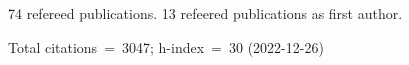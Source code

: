 74 refereed publications. 13 refeered publications as first author.

Total citations~=~3047; h-index~=~30 (2022-12-26)